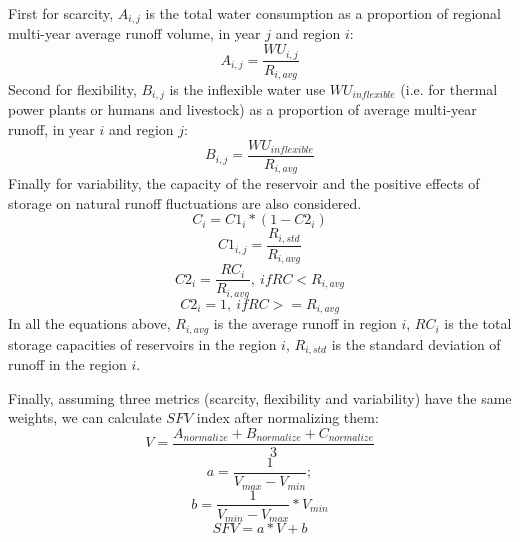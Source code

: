\documentclass[9pt,twoside,lineno]{pnas-new}
\begin{document}
	First for scarcity, $A_{i, j}$ is the total water consumption as a proportion of regional multi-year average runoff volume, in year $j$ and region $i$:
	$$ A_{i, j} = \frac{WU_{i,j}}{R_{i, avg}} $$
	Second for flexibility, $B_{i, j}$ is the inflexible water use $WU_{inflexible}$ (i.e. for thermal power plants or humans and livestock) as a proportion of average multi-year runoff, in year $i$ and region $j$:
	$$ B_{i, j} = \frac{WU_{inflexible}}{R_{i, avg}} $$
	Finally for variability, the capacity of the reservoir and the positive effects of storage on natural runoff fluctuations are also considered.
	$$ C_i = C1_i * (1 - C2_i) $$
	$$ C1_{i, j} = \frac{R_{i, std}}{R_{i, avg}} $$
	$$ C2_{i} = \frac{RC_{i}}{R_{i, avg}}, \ if RC < R_{i, avg} $$
	$$ C2_{i} = 1, \ if RC >= R_{i, avg} $$
	In all the equations above, $R_{i, avg}$ is the average runoff in region $i$, $RC_i$ is the total storage capacities of reservoirs in the region $i$, $R_{i, std}$ is the standard deviation of runoff in the region $i$.

	Finally, assuming three metrics (scarcity, flexibility and variability) have the same weights, we can calculate $SFV$ index after normalizing them:
	$$ V = \frac{A_{normalize} + B_{normalize} + C_{normalize}}{3} $$
	$$ a = \frac{1}{V_{max} - V_{min}}; $$
	$$ b = \frac{1}{V_{min} - V_{max}} * V_{min} $$
	$$ SFV = a * V + b $$
\end{document}
